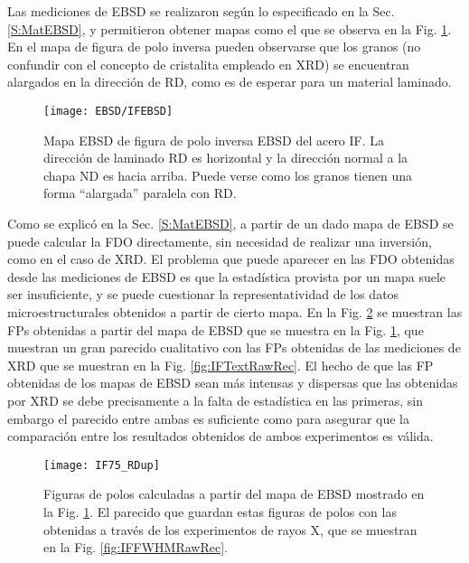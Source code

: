 Las mediciones de EBSD se realizaron según lo especificado en la Sec. \ref{S:MatEBSD}, y permitieron obtener mapas como el que se observa en la Fig. \ref{fig:IFEBSD}.
En el mapa de figura de polo inversa pueden observarse que los granos (no confundir con el concepto de cristalita empleado en XRD) se encuentran alargados en la dirección de RD, como es de esperar para un material laminado.

\begin{figure}[!htb]
  \centering
  \texttt{[image: EBSD/IFEBSD]}
  \caption{Mapa EBSD de figura de polo inversa EBSD del acero IF. La dirección de laminado RD es horizontal y la dirección normal a la chapa ND es hacia arriba. Puede verse como los granos tienen una forma ``alargada'' paralela con RD.}
  \label{fig:IFEBSD}
\end{figure}

Como se explicó en la Sec. \ref{S:MatEBSD}, a partir de un dado mapa de EBSD se puede calcular la FDO directamente, sin necesidad de realizar una inversión, como en el caso de XRD.
El problema que puede aparecer en las FDO obtenidas desde las mediciones de EBSD es que la estadística provista por un mapa suele ser insuficiente, y se puede cuestionar la representatividad de los datos microestructurales obtenidos a partir de cierto mapa.
En la Fig. \ref{fig:IFEBSDText} se muestran las FPs obtenidas a partir del mapa de EBSD que se muestra en la Fig. \ref{fig:IFEBSD}, que muestran un gran parecido cualitativo con las FPs obtenidas de las mediciones de XRD que se muestran en la Fig. \ref{fig:IFTextRawRec}.
El hecho de que las FP obtenidas de los mapas de EBSD sean más intensas y dispersas que las obtenidas por XRD se debe precisamente a la falta de estadística en las primeras, sin embargo el parecido entre ambas es suficiente como para asegurar que la comparación entre los resultados obtenidos de ambos experimentos es válida.

\begin{figure}[!htb]
  \centering
  \texttt{[image: IF75\_RDup]}
  \caption{Figuras de polos calculadas a partir del mapa de EBSD mostrado en la Fig. \ref{fig:IFEBSD}. El parecido que guardan estas figuras de polos con las obtenidas a través de los experimentos de rayos X, que se muestran en la Fig. \ref{fig:IFFWHMRawRec}.}
  \label{fig:IFEBSDText}
\end{figure}

